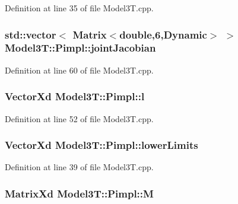 Definition at line 35 of file Model3\+T.\+cpp.

\subsubsection[{\texorpdfstring{joint\+Jacobian}{jointJacobian}}]{\setlength{\rightskip}{0pt plus 5cm}std\+::vector$<$ Matrix$<$double,6,Dynamic$>$ $>$ Model3\+T\+::\+Pimpl\+::joint\+Jacobian}\hypertarget{structModel3T_1_1Pimpl_a8dbebd103170b8f5b8aa5ce4dd383696}{}\label{structModel3T_1_1Pimpl_a8dbebd103170b8f5b8aa5ce4dd383696}


Definition at line 60 of file Model3\+T.\+cpp.

\subsubsection[{\texorpdfstring{l}{l}}]{\setlength{\rightskip}{0pt plus 5cm}Vector\+Xd Model3\+T\+::\+Pimpl\+::l}\hypertarget{structModel3T_1_1Pimpl_a7fcae8ba57e320a9066aa9b640f414cb}{}\label{structModel3T_1_1Pimpl_a7fcae8ba57e320a9066aa9b640f414cb}


Definition at line 52 of file Model3\+T.\+cpp.

\subsubsection[{\texorpdfstring{lower\+Limits}{lowerLimits}}]{\setlength{\rightskip}{0pt plus 5cm}Vector\+Xd Model3\+T\+::\+Pimpl\+::lower\+Limits}\hypertarget{structModel3T_1_1Pimpl_a635ed979bb210444627f06eb65db8f29}{}\label{structModel3T_1_1Pimpl_a635ed979bb210444627f06eb65db8f29}


Definition at line 39 of file Model3\+T.\+cpp.

\subsubsection[{\texorpdfstring{M}{M}}]{\setlength{\rightskip}{0pt plus 5cm}Matrix\+Xd Model3\+T\+::\+Pimpl\+::M}\hypertarget{structModel3T_1_1Pimpl_a2756947646bc2a7485760f1599011764}{}\label{structModel3T_1_1Pimpl_a2756947646bc2a7485760f1599011764}


